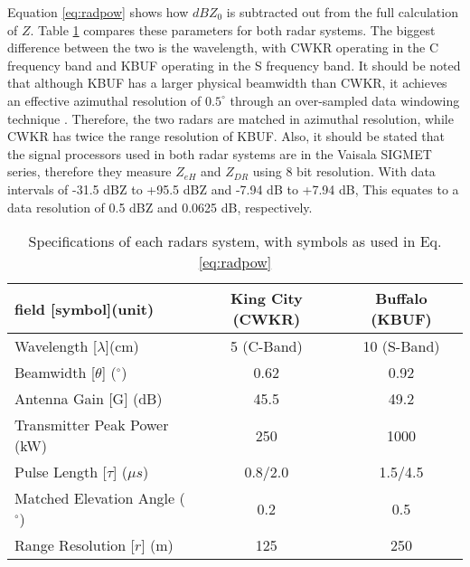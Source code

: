 Equation \ref{eq:radpow} shows how $dBZ_0$ is subtracted out from the full calculation of $Z$. Table \ref{radarspecs} compares these parameters for both radar systems. The biggest difference between the two is the wavelength, with CWKR operating in the C frequency band and KBUF operating in the S frequency band. It should be noted that although KBUF has a larger physical beamwidth than CWKR, it achieves an effective azimuthal resolution of $0.5^{\circ}$ through an over-sampled data windowing technique \citep{Torres2007}. Therefore, the two radars are matched in azimuthal resolution, while CWKR has twice the range resolution of KBUF. Also, it should be stated that the signal processors used in both radar systems are in the Vaisala SIGMET series, therefore they measure $Z_{eH}$ and $Z_{DR}$ using 8 bit resolution. With data intervals of -31.5 dBZ to +95.5 dBZ and -7.94 dB to +7.94 dB, This equates to a data resolution of 0.5 dBZ and 0.0625 dB, respectively.

\begin{table}[h]
    \caption{Specifications of each radars system, with symbols as used in Eq. \ref{eq:radpow}}\label{radarspecs}
    \begin{center}
    \begin{tabular}{|l|c|c|}
    \hline
     field [symbol](unit) & King City (CWKR) & Buffalo (KBUF) \\
    \hline\hline
    Wavelength [$\lambda$](cm) & 5 (C-Band) & 10 (S-Band) \\
    \hline
    Beamwidth [$\theta$] ($^\circ$)  & 0.62  & 0.92 \\
    \hline
     Antenna Gain [G] (dB) & 45.5 & 49.2 \\
    \hline
     Transmitter Peak Power (kW) & 250 & 1000 \\
    \hline
     Pulse Length [$\tau$] ($\mu s$) &  0.8/2.0 & 1.5/4.5 \\
    \hline
     Matched Elevation Angle ($^\circ$) & 0.2 & 0.5 \\
    \hline
     Range Resolution [$r$] (m)& 125 & 250 \\
    \hline
    \end{tabular}
    \end{center}
\end{table}


